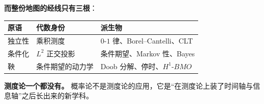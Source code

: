 \textbf{而整份地图的经线只有三根}：

\begin{center}
\begin{tabular}{L{2.4cm}L{3.2cm}L{7cm}}
\toprule
\textbf{原语} & \textbf{代数身份} & \textbf{派生物} \\
\midrule
独立性 & 乘积测度 & $0$-$1$ 律、Borel--Cantelli、CLT \\
条件化 & $L^2$ 正交投影 & 条件期望、Markov 性、Bayes \\
鞅 & 条件期望的动力学 & Doob 分解、停时、$H^1$-$BMO$ \\
\bottomrule
\end{tabular}
\end{center}

\textbf{测度论一个都没有。} 概率论不是测度论的应用，它是“在测度论上装了时间轴与信息轴”之后长出来的新学科。